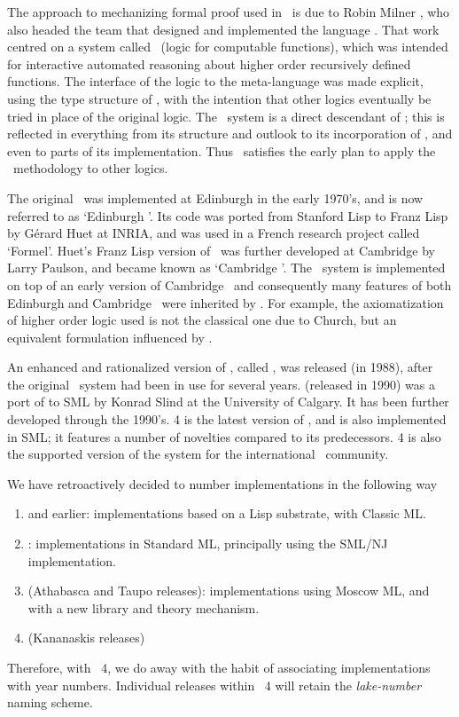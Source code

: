 The approach to mechanizing formal proof used in \HOL\ is due to Robin Milner
\cite{Edinburgh-LCF}, who also headed the team that designed and implemented
the language \ML.  That work centred on a system called \LCF\ (logic for
computable functions), which was intended for interactive automated reasoning
about higher order recursively defined functions.  The interface of the logic
to the meta-language was made explicit, using the type structure of \ML, with
the intention that other logics eventually be tried in place of the original
logic.  The \HOL\ system is a direct descendant of \LCF; this is reflected in
everything from its structure and outlook to its incorporation of \ML, and even
to parts of its implementation.  Thus \HOL\ satisfies the early plan to apply
the \LCF\ methodology to other logics.

The original \LCF\ was implemented at Edinburgh in the early 1970's, and is now
referred to as `Edinburgh \LCF'. Its code was ported from Stanford Lisp to
Franz Lisp by G\'erard Huet at {\small INRIA}, and was used in a French
research project called `Formel'.  Huet's Franz Lisp version of \LCF\ was
further developed at Cambridge by Larry Paulson, and became known as `Cambridge
\LCF'. The \HOL\ system is implemented on top of an early version of Cambridge
\LCF\ and consequently many features of both Edinburgh and Cambridge \LCF\ were
inherited by \HOL. For example, the axiomatization of higher order logic used
is not the classical one due to Church, but an equivalent formulation
influenced by \LCF.

An enhanced and rationalized version of \HOL, called , was
released (in 1988), after the original \HOL\ system had been in use
for several years.   (released in 1990) was a port of 
to SML \cite{sml} by Konrad Slind at the University of Calgary. It has
been further developed through the 1990's. \HOL{} 4 is the latest
version of \HOL, and is also implemented in SML; it features a number
of novelties compared to its predecessors.  \HOL{} 4 is also the
supported version of the system for the international \HOL\ community.

We have retroactively decided to number \HOL{} implementations in the
following way
\begin{enumerate}
\item {} and earlier: implementations based on a Lisp substrate,
  with Classic ML.
\item {}: implementations in Standard ML, principally using the
  SML/NJ implementation.
\item {} (Athabasca and Taupo releases): implementations using
  Moscow ML, and with a new library and theory mechanism.
\item \HOL{} (Kananaskis releases)
\end{enumerate}
Therefore, with \HOL{}~4, we do away with the habit of associating
implementations with year numbers.  Individual releases within
\HOL{}~4 will retain the \textit{lake-number} naming scheme.

